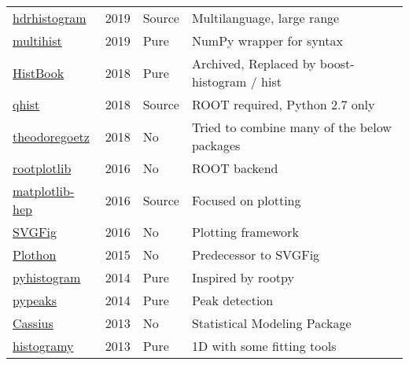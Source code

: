 \documentclass{webofc}
\begin{document}
\begin{table}[h]
\begin{tabular}{llll}
		\href{https://pypi.org/project/hdrhistogram/}{hdrhistogram}                  & 2019         & Source & Multilanguage, large range                           \\
		\href{https://pypi.org/project/multihist/}{multihist}                        & 2019         & Pure   & NumPy wrapper for syntax                             \\
		\href{https://github.com/scikit-hep/histbook}{HistBook}                      & 2018         & Pure   & Archived, Replaced by boost-histogram / hist         \\
		\href{https://pypi.org/project/qhist/}{qhist}                                & 2018         & Source & ROOT required, Python 2.7 only                       \\
		\href{https://github.com/theodoregoetz/histogram}{theodoregoetz}             & 2018         & No     & Tried to combine many of the below packages          \\
		\href{https://github.com/drdavis/rootplotlib}{rootplotlib}                   & 2016         & No     & ROOT backend                                         \\
		\href{https://pypi.org/project/matplotlib-hep/}{matplotlib-hep}              & 2016         & Source & Focused on plotting                                  \\
		\href{https://github.com/jpivarski/svgfig}{SVGFig}                           & 2016         & No     & Plotting framework                                   \\
		\href{https://github.com/jpivarski/plothon}{Plothon}                         & 2015         & No     & Predecessor to SVGFig                                \\
		\href{https://pypi.org/project/pyhistogram/}{pyhistogram}                    & 2014         & Pure   & Inspired by rootpy                                   \\
		\href{https://pypi.org/project/pypeaks}{pypeaks}                             & 2014         & Pure   & Peak detection                                       \\
		\href{https://github.com/opendatagroup/cassius}{Cassius}                     & 2013         & No     & Statistical Modeling Package                         \\
		\href{https://pypi.org/project/histogramy}{histogramy}                       & 2013         & Pure   & 1D with some fitting tools                           \\

\end{tabular}
\end{table}
\end{document}
